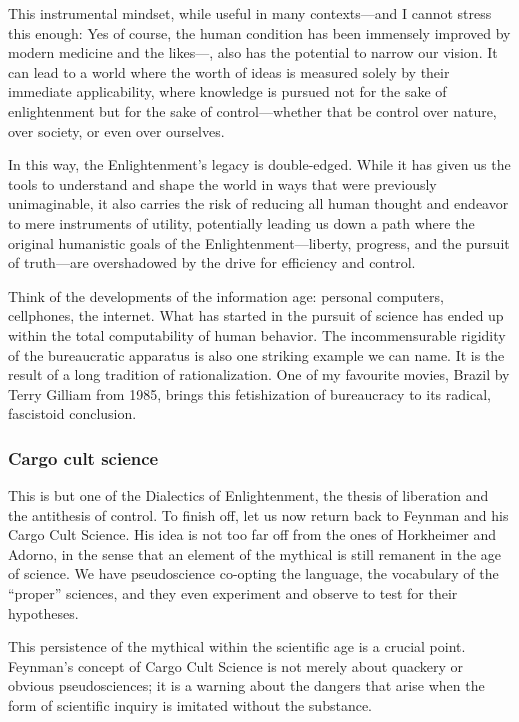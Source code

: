 This instrumental mindset, while useful in many contexts---and I cannot
stress this enough: Yes of course, the human condition has been immensely
improved by modern medicine and the likes---, also has the
potential to narrow our vision. It can lead to a world where the worth of ideas
is measured solely by their immediate applicability, where knowledge is pursued
not for the sake of enlightenment but for the sake of control—whether that be
control over nature, over society, or even over ourselves.

In this way, the Enlightenment's legacy is double-edged. While it has given us
the tools to understand and shape the world in ways that were previously
unimaginable, it also carries the risk of reducing all human thought and
endeavor to mere instruments of utility, potentially leading us down a path
where the original humanistic goals of the Enlightenment—liberty, progress, and
the pursuit of truth—are overshadowed by the drive for efficiency and control.

Think of the developments of the information age: personal computers,
cellphones, the internet. What has started in the pursuit of science has ended
up within the total computability of human behavior. The incommensurable
rigidity of the bureaucratic apparatus is also one striking example we can
name. It is the result of a long tradition of rationalization. One of my
favourite movies, Brazil by Terry Gilliam from 1985, brings this fetishization
of bureaucracy to its radical, fascistoid conclusion.

\subsubsection*{Cargo cult science}
This is but one of the Dialectics of Enlightenment, the thesis of liberation
and the antithesis of control. To finish off, let us now return back to Feynman
and his Cargo Cult Science. His idea is not too far off from the ones of
Horkheimer and Adorno, in the sense that an element of the mythical is still
remanent in the age of science. We have pseudoscience co-opting the language,
the vocabulary of the \enquote{proper} sciences, and they even experiment and
observe to test for their hypotheses. 

This persistence of the mythical within the scientific age is a crucial point.
Feynman’s concept of Cargo Cult Science is not merely about quackery or obvious
pseudosciences; it is a warning about the dangers that arise when the form of
scientific inquiry is imitated without the substance.

